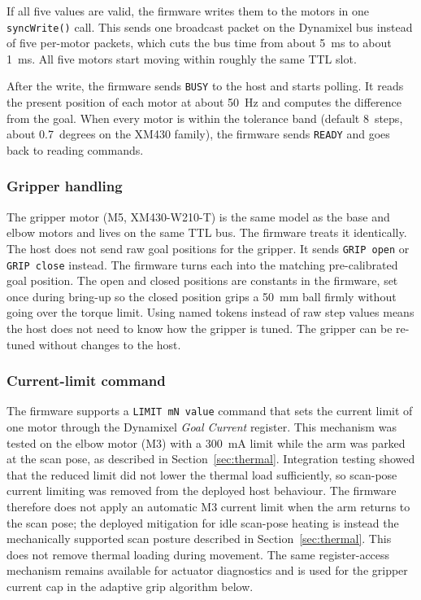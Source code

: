 If all five values are valid, the firmware writes them to the motors
in one \texttt{syncWrite()} call. This sends one broadcast packet on
the Dynamixel bus instead of five per-motor packets, which cuts the
bus time from about 5~ms to about 1~ms. All five motors start moving
within roughly the same TTL slot.

After the write, the firmware sends \texttt{BUSY} to the host and
starts polling. It reads the present position of each motor at about
50~Hz and computes the difference from the goal. When every motor is
within the tolerance band (default 8~steps, about 0.7~degrees on the
XM430 family), the firmware sends \texttt{READY} and goes back to
reading commands.

\subsubsection*{Gripper handling}

The gripper motor (M5, XM430-W210-T) is the same model as the base
and elbow motors and lives on the same TTL bus. The firmware treats it
identically. The host does not send raw goal positions for the
gripper. It sends \texttt{GRIP open} or \texttt{GRIP close} instead.
The firmware turns each into the matching pre-calibrated goal
position. The open and closed positions are constants in the firmware,
set once during bring-up so the closed position grips a 50~mm ball
firmly without going over the torque limit. Using named tokens
instead of raw step values means the host does not need to know how
the gripper is tuned. The gripper can be re-tuned without changes to
the host.

\subsubsection*{Current-limit command}

The firmware supports a \texttt{LIMIT mN value} command that sets the
current limit of one motor through the Dynamixel \emph{Goal Current}
register. This mechanism was tested on the elbow motor (M3) with a
300~mA limit while the arm was parked at the scan pose, as described
in Section~\ref{sec:thermal}. Integration testing showed that the reduced limit did
not lower the thermal load sufficiently, so scan-pose current limiting
was removed from the deployed host behaviour. The firmware therefore
does not apply an automatic M3 current limit when the arm returns to
the scan pose; the deployed mitigation for idle scan-pose heating is
instead the mechanically supported scan posture described in
Section~\ref{sec:thermal}. This does not remove thermal loading during
movement. The same register-access mechanism remains available for
actuator diagnostics and is used for the gripper current cap in the
adaptive grip algorithm below.

